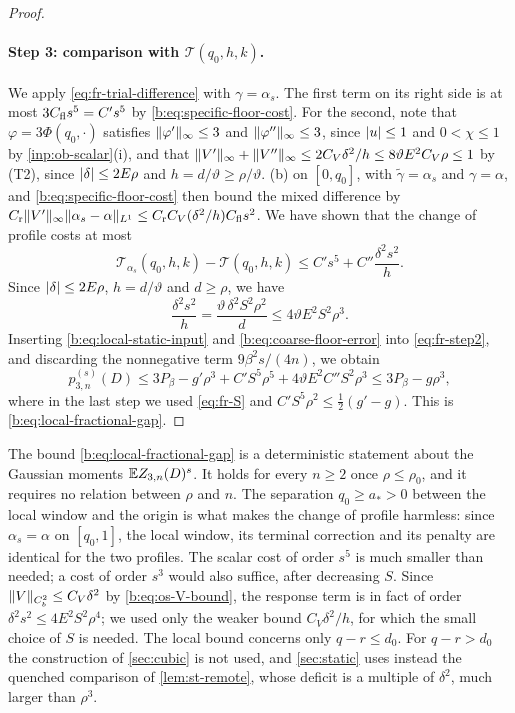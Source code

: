\begin{proof}
\paragraph{Step 3: comparison with $\mathcal T(q_0,h,k)$.} We apply \eqref{eq:fr-trial-difference} with $\gamma=\alpha_s$. The first term on its right side is at most $3C_{\rm fl}s^5=C's^5$ by \eqref{b:eq:specific-floor-cost}. For the second, note that $\varphi=3\Phi(q_0,\cdot)$ satisfies $\lVert \varphi'\rVert_\infty\le3$ and $\lVert \varphi''\rVert_\infty\le3$, since $\lvert u\rvert\le1$ and $0<\chi\le1$ by \cref{inp:ob-scalar}(i), and that $\lVert V'\rVert_\infty+\lVert V''\rVert_\infty\le2C_V\delta^2/h\le8\vartheta E^2C_V\rho\le1$ by (T2), since $\lvert \delta\rvert\le2E\rho$ and $h=d/\vartheta\ge\rho/\vartheta$. (b) on $[0,q_0]$, with $\widetilde\gamma=\alpha_s$ and $\gamma=\alpha$, and \eqref{b:eq:specific-floor-cost} then bound the mixed difference by $C_{\rm r}\lVert V'\rVert_\infty\lVert \alpha_s-\alpha\rVert_{L^1}\le C_{\rm r}C_V(\delta^2/h)C_{\rm fl}s^2$. We have shown that the change of profile costs at most
\begin{equation}\label{b:eq:coarse-floor-error}
 \mathcal T_{\alpha_s}(q_0,h,k)-\mathcal T(q_0,h,k)\le C's^5+C''\frac{\delta^2s^2}h.
\end{equation}
Since $\lvert \delta\rvert\le2E\rho$, $h=d/\vartheta$ and $d\ge\rho$, we have
\[
 \frac{\delta^2s^2}h=\frac{\vartheta\,\delta^2S^2\rho^2}d\le4\vartheta E^2S^2\rho^3.
\]
Inserting \eqref{b:eq:local-static-input} and \eqref{b:eq:coarse-floor-error} into \eqref{eq:fr-step2}, and discarding the nonnegative term $9\beta^2s/(4n)$, we obtain
\[
 p^{(s)}_{3,n}(D)\le3P_\beta-g'\rho^3+C'S^5\rho^5+4\vartheta E^2C''S^2\rho^3\le3P_\beta-g\rho^3,
\]
where in the last step we used \eqref{eq:fr-S} and $C'S^5\rho^2\le\frac12(g'-g)$. This is \eqref{b:eq:local-fractional-gap}.
\end{proof}

\begin{remark}\label{rem:fr-local-scope}
The bound \eqref{b:eq:local-fractional-gap} is a deterministic statement about the Gaussian moments $\mathbb E Z_{3,n}(D)^s$. It holds for every $n\ge2$ once $\rho\le\rho_0$, and it requires no relation between $\rho$ and $n$. The separation $q_0\ge a_*>0$ between the local window and the origin is what makes the change of profile harmless: since $\alpha_s=\alpha$ on $[q_0,1]$, the local window, its terminal correction and its penalty are identical for the two profiles. The scalar cost of order $s^5$ is much smaller than needed; a cost of order $s^3$ would also suffice, after decreasing $S$. Since $\lVert V\rVert_{C^2_b}\le C_V\delta^2$ by \eqref{b:eq:os-V-bound}, the response term is in fact of order $\delta^2s^2\le4E^2S^2\rho^4$; we used only the weaker bound $C_V\delta^2/h$, for which the small choice of $S$ is needed. The local bound concerns only $q-r\le d_0$. For $q-r>d_0$ the construction of \cref{sec:cubic} is not used, and \cref{sec:static} uses instead the quenched comparison of \cref{lem:st-remote}, whose deficit is a multiple of $\delta^2$, much larger than $\rho^3$.
\end{remark}
